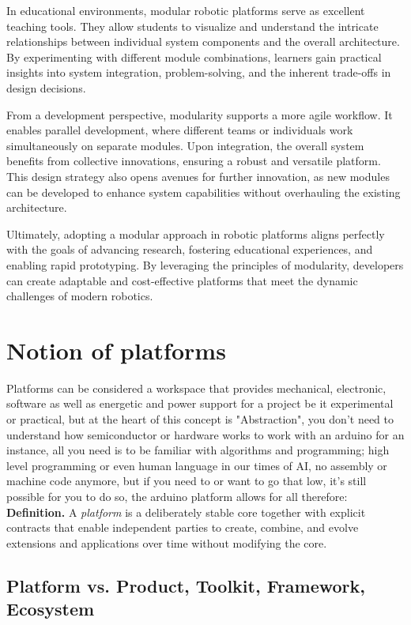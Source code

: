 In educational environments, modular robotic platforms serve as excellent teaching tools. They allow students to visualize and understand the intricate relationships between individual system components and the overall architecture. By experimenting with different module combinations, learners gain practical insights into system integration, problem-solving, and the inherent trade-offs in design decisions.

From a development perspective, modularity supports a more agile workflow. It enables parallel development, where different teams or individuals work simultaneously on separate modules. Upon integration, the overall system benefits from collective innovations, ensuring a robust and versatile platform. This design strategy also opens avenues for further innovation, as new modules can be developed to enhance system capabilities without overhauling the existing architecture.

Ultimately, adopting a modular approach in robotic platforms aligns perfectly with the goals of advancing research, fostering educational experiences, and enabling rapid prototyping. By leveraging the principles of modularity, developers can create adaptable and cost-effective platforms that meet the dynamic challenges of modern robotics.

\section{Notion of platforms}
Platforms can be considered a workspace that provides mechanical, electronic, software as well as energetic and power support for a project be it experimental or practical, but at the heart of this concept is "Abstraction", you don't need to understand how semiconductor or hardware works to work with an arduino for an instance, all you need is to be familiar with algorithms and programming; high level programming or even human language in our times of AI, no assembly or machine code anymore, but if you need to or want to go that low, it's still possible for you to do so, the arduino platform allows for all therefore:\\

\textbf{Definition.} A \emph{platform} is a deliberately stable core together with explicit contracts that enable independent parties to create, combine, and evolve extensions and applications over time without modifying the core.

\subsection{Platform vs. Product, Toolkit, Framework, Ecosystem}

